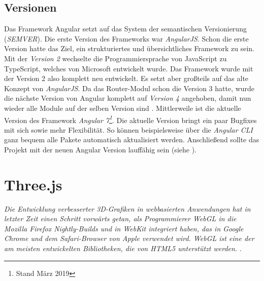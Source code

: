 \subsection{Versionen}
Das Framework Angular setzt auf das System der semantischen Versionierung (\textit{SEMVER}). Die erste Version des Frameworks war \textit{AngularJS}. Schon die erste Version hatte das Ziel, ein strukturiertes und übersichtliches Framework zu sein. Mit der \textit{Version 2} wechselte die Programmiersprache von JavaScript zu TypeScript, welches von Microsoft entwickelt wurde. Das Framework wurde mit der Version 2 also komplett neu entwickelt. Es setzt aber großteils auf das alte Konzept von \textit{AngularJS}. Da das Router-Modul schon die Version 3 hatte, wurde die nächste Version von Angular komplett auf \textit{Version 4} angehoben, damit nun wieder alle Module auf der selben Version sind \cite{bohm_robin_angular_2017}. Mittlerweile ist die aktuelle Version des Framework \textit{Angular 7\footnote{Stand März 2019}}. Die aktuelle Version bringt ein paar Bugfixes mit sich sowie mehr Flexibilität. So können beispielsweise über die \textit{Angular CLI} ganz bequem alle Pakete automatisch aktualisiert werden. Anschließend sollte das Projekt mit der neuen Angular Version lauffähig sein (siehe \cite{steyer_ruhe_2018}).
%
%
%
%
%
\section{Three.js}
\label{sec:three.js}
%
\textit{Die Entwicklung verbesserter 3D-Grafiken in webbasierten Anwendungen hat in letzter Zeit einen Schritt vorwärts getan, als Programmierer WebGL in die Mozilla Firefox Nightly-Builds und in WebKit integriert haben, das in Google Chrome und dem Safari-Browser von Apple verwendet wird. WebGL ist eine der am meisten entwickelten Bibliotheken, die von HTML5 unterstützt werden. }\cite{bahor_html5/webgl_2013}.\\
%
%
%
%
%
